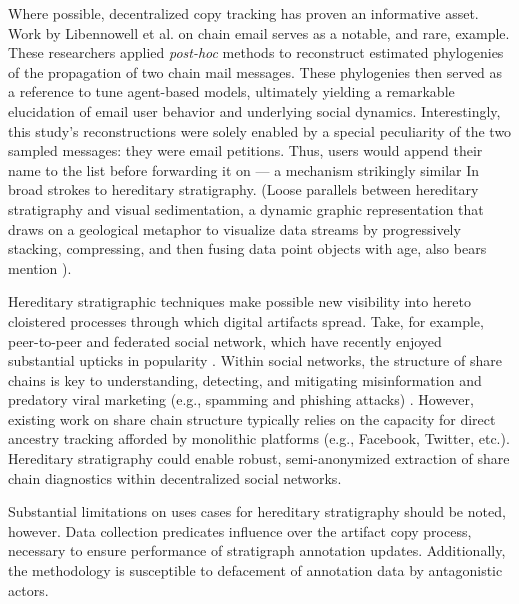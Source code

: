Where possible, decentralized copy tracking has proven an informative asset.
Work by Libennowell et al. on chain email serves as a notable, and rare, example.
These researchers applied \textit{post-hoc} methods to reconstruct estimated phylogenies of the propagation of two chain mail messages.
These phylogenies then served as a reference to tune agent-based models, ultimately yielding a remarkable elucidation of email user behavior and underlying social dynamics.
Interestingly, this study's reconstructions were solely enabled by a special peculiarity of the two sampled messages: they were email petitions.
Thus, users would append their name to the list before forwarding it on --- a mechanism strikingly similar In broad strokes to hereditary stratigraphy.
(Loose parallels between hereditary stratigraphy and visual sedimentation, a dynamic graphic representation that draws on a geological metaphor to visualize data streams by progressively stacking, compressing, and then fusing data point objects with age, also bears mention \citep{huron2013visual}).

Hereditary stratigraphic techniques make possible new visibility into hereto cloistered processes through which digital artifacts spread.
Take, for example, peer-to-peer and federated social network, which have recently enjoyed substantial upticks in popularity \citep{la2021understanding}.
Within social networks, the structure of share chains is key to understanding, detecting, and mitigating misinformation \citep{kucharski2016study,raponi2022fake} and predatory viral marketing (e.g., spamming and phishing attacks) \citep{guidi2018managing}.
However, existing work on share chain structure typically relies on the capacity for direct ancestry tracking afforded by monolithic platforms (e.g., Facebook, Twitter, etc.).
Hereditary stratigraphy could enable robust, semi-anonymized extraction of share chain diagnostics within decentralized social networks.

Substantial limitations on uses cases for hereditary stratigraphy should be noted, however.
Data collection predicates influence over the artifact copy process, necessary to ensure performance of stratigraph annotation updates.
Additionally, the methodology is susceptible to defacement of annotation data by antagonistic actors.
